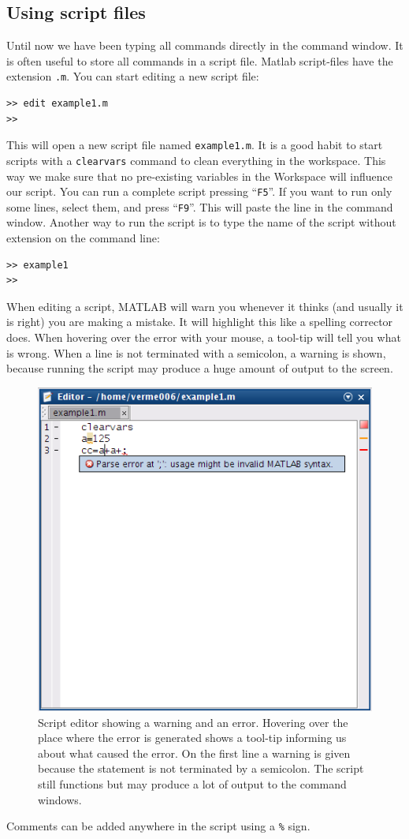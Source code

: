 \documentclass[a4paper]{article}
\begin{document}
\subsection{Using script files}
Until now we have been typing all commands directly in the command window. It is often useful to store all commands in a script file. Matlab script-files have the extension \lstinline=.m=. You can start editing a new script file:
\begin{lstlisting}
>> edit example1.m
>>
\end{lstlisting}
This will open a new script file named \lstinline=example1.m=. It is a good habit to start scripts with a \lstinline!clearvars! command to clean everything in the workspace. This way we make sure that no pre-existing variables in the Workspace will influence our script. You can run a complete script pressing ``\lstinline!F5!''. If you want to run only some lines, select them, and press ``\lstinline!F9!''. This will paste the line in the command window. Another way to run the script is to type  the name of the script without extension on the command line:
\begin{lstlisting}
>> example1
>>
\end{lstlisting}
When editing a script, MATLAB will  warn you whenever it thinks (and usually it is right) you are making a mistake. It will highlight this like a spelling corrector does. When hovering over the error with your mouse, a tool-tip will tell you what is wrong.
When a line is not terminated with a semicolon, a warning is shown, because running the script may produce a huge amount of output to the screen.
\begin{figure}
  \centering
  \includegraphics[width=.5\linewidth]{script.png}
    \caption{Script editor showing a warning and an error. Hovering over the place where the error is generated shows a tool-tip informing us about what caused the error. On the first line a warning is given because the statement is not terminated by a semicolon. The script still functions but may produce a lot of output to the command windows.}
    \label{fig:script}
\end{figure}
Comments can be added anywhere in the script using a \lstinline!%! sign. 
\end{document}
